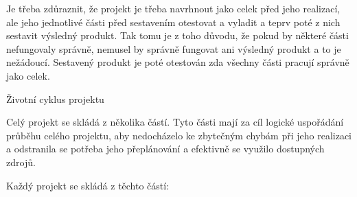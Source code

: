 Je třeba zdůraznit, že projekt je třeba navrhnout jako celek před jeho realizací, ale jeho jednotlivé části před sestavením otestovat a vyladit a teprv poté z nich sestavit výsledný produkt. Tak tomu je z toho důvodu, že pokud by některé části nefungovaly správně, nemusel by správně fungovat ani výsledný produkt a to je nežádoucí. Sestavený produkt je poté otestován zda všechny části pracují správně jako celek.

\chap Životní cyklus projektu

Celý projekt se skládá z několika částí. Tyto části mají za cíl logické uspořádání průběhu celého projektu, aby nedocházelo ke zbytečným chybám při jeho realizaci a odstranila se potřeba jeho přeplánování a efektivně se využilo dostupných zdrojů.

Každý projekt se skládá z těchto částí:


